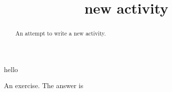 \documentclass{ximera}
\title{new activity}
\begin{document}
\begin{abstract}
	An attempt to write a new activity.
\end{abstract}
\maketitle

hello
\begin{exercise}
An exercise. The answer is 
\end{exercise}
\end{document}
